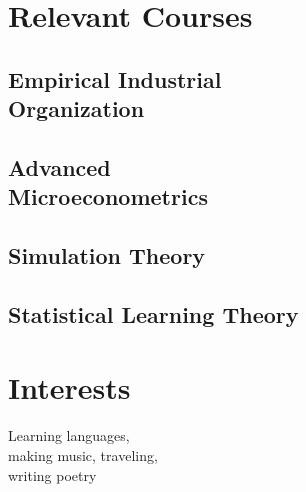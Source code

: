 \documentclass[]{resume}
\begin{document}
\begin{minipage}[t]{0.25\textwidth}

	\section{Relevant Courses}
	\subsection{Empirical Industrial \\ Organization}
	\sectionsep

	\subsection{Advanced \\ Microeconometrics}
	\sectionsep

	\subsection{Simulation Theory}
	\sectionsep

	\subsection{Statistical Learning Theory}
	\sectionsep
	\sectionsep


	\section{Interests}
	Learning languages, \\
	making music,
	traveling, \\
	writing poetry

\end{minipage}
\end{document}
